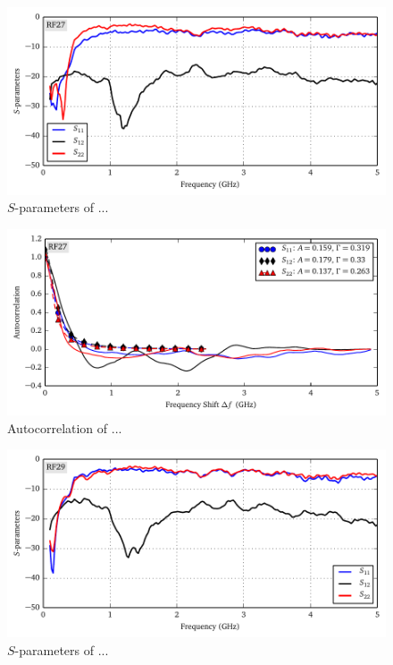 \begin{figure}
 \centering
 \includegraphics{figs/active/RF27-sParameters.pdf}
 \caption{$S$-parameters of ...}
\end{figure}

\begin{figure}
 \centering
 \includegraphics{figs/active/RF27-autoCorrelation.pdf}
 \caption{Autocorrelation of ...}
\end{figure}

\begin{figure}
 \centering
 \includegraphics{figs/active/RF29-sParameters.pdf}
 \caption{$S$-parameters of ...}
\end{figure}

